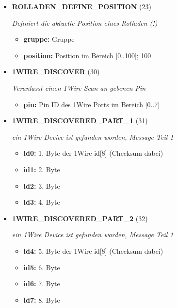 \begin{itemize}
\item \textbf{ROLLADEN\_DEFINE\_POSITION} (23)

\textit{Definiert die aktuelle Position eines Rolladen (!)}

\small
\begin{itemize}
		
\item \textbf{gruppe:} Gruppe
\item \textbf{position:} Position im Bereich [0..100]; 100%
\end{itemize}
\normalsize
	
\item \textbf{1WIRE\_DISCOVER} (30)

\textit{Veranlasst einen 1Wire Scan an gebenen Pin}

\small
\begin{itemize}
		
\item \textbf{pin:} Pin ID des 1Wire Ports im Bereich [0..7]
\end{itemize}
\normalsize
	
\item \textbf{1WIRE\_DISCOVERED\_PART\_1} (31)

\textit{ein 1Wire Device ist gefunden worden, Message Teil 1}

\small
\begin{itemize}
		
\item \textbf{id0:} 1. Byte der 1Wire id[8] (Checksum dabei)
\item \textbf{id1:} 2. Byte
\item \textbf{id2:} 3. Byte
\item \textbf{id3:} 4. Byte
\end{itemize}
\normalsize
	
\item \textbf{1WIRE\_DISCOVERED\_PART\_2} (32)

\textit{ein 1Wire Device ist gefunden worden, Message Teil 1}

\small
\begin{itemize}
		
\item \textbf{id4:} 5. Byte der 1Wire id[8] (Checksum dabei)
\item \textbf{id5:} 6. Byte
\item \textbf{id6:} 7. Byte
\item \textbf{id7:} 8. Byte
\end{itemize}
\normalsize
	

\end{itemize}

